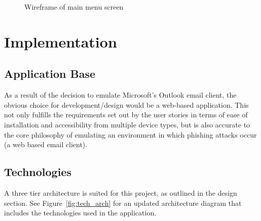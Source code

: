 \documentclass{l4proj}
\begin{document}
\begin{figure}[H]
    \centering
    \caption{Wireframe of main menu screen}
    \label{fig:menu_wf} 
\end{figure}

\chapter{Implementation}

\section{Application Base}
As a result of the decision to emulate Microsoft's Outlook email client, the obvious choice for development/design would be a web-based application. This not only fulfills the requirements set out by the user stories in terms of ease of installation and accessibility from multiple device types, but is also accurate to the core philosophy of emulating an environment in which phishing attacks occur (a web based email client).

\section{Technologies}
 A three tier architecture is suited for this project, as outlined in the design section. See Figure~\ref{fig:tech_arch} for an updated architecture diagram that includes the technologies used in the application.
\end{document}
